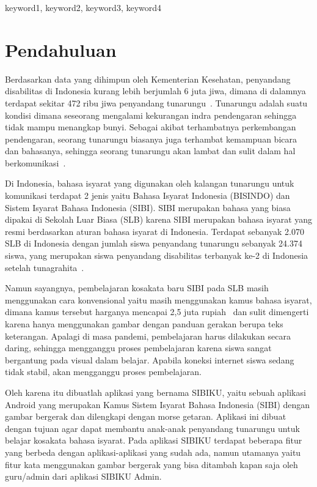 \documentclass[conference,a4paper,10pt]{IEEEtran}
\begin{document}
\begin{IEEEkeywords}
    keyword1, keyword2, keyword3, keyword4
\end{IEEEkeywords}

\section{Pendahuluan}
Berdasarkan data yang dihimpun oleh Kementerian Kesehatan, penyandang
disabilitas di Indonesia kurang lebih berjumlah 6 juta jiwa, dimana di dalamnya
terdapat sekitar 472 ribu jiwa penyandang tunarungu~\cite{ref1}. Tunarungu adalah
suatu kondisi dimana seseorang mengalami kekurangan indra pendengaran sehingga
tidak mampu menangkap bunyi. Sebagai akibat terhambatnya perkembangan pendengaran,
seorang tunarungu biasanya juga terhambat kemampuan bicara dan bahasanya,
sehingga seorang tunarungu akan lambat dan sulit dalam hal berkomunikasi~\cite{ref2}.

Di Indonesia, bahasa isyarat yang digunakan oleh kalangan tunarungu untuk
komunikasi terdapat 2 jenis yaitu Bahasa Isyarat Indonesia (BISINDO) dan Sistem
Isyarat Bahasa Indonesia (SIBI). SIBI merupakan bahasa yang biasa dipakai di
Sekolah Luar Biasa (SLB) karena SIBI merupakan bahasa isyarat yang resmi
berdasarkan aturan bahasa isyarat di Indonesia. Terdapat sebanyak 2.070 SLB di
Indonesia dengan jumlah siswa penyandang tunarungu sebanyak 24.374 siswa, yang
merupakan siswa penyandang disabilitas terbanyak ke-2 di Indonesia setelah
tunagrahita~\cite{ref3}.

Namun sayangnya, pembelajaran kosakata baru SIBI pada SLB masih menggunakan
cara konvensional yaitu masih menggunakan kamus bahasa isyarat, dimana kamus
tersebut harganya mencapai 2,5 juta rupiah~\cite{ref4} dan sulit dimengerti
karena hanya menggunakan gambar dengan panduan gerakan berupa teks keterangan.
Apalagi di masa pandemi, pembelajaran harus dilakukan secara daring, sehingga
mengganggu proses pembelajaran karena siswa sangat bergantung pada visual dalam
belajar. Apabila koneksi internet siswa sedang tidak stabil, akan mengganggu
proses pembelajaran.

Oleh karena itu dibuatlah aplikasi yang bernama SIBIKU, yaitu sebuah aplikasi
Android yang merupakan Kamus Sistem Isyarat Bahasa Indonesia (SIBI) dengan
gambar bergerak dan dilengkapi dengan morse getaran. Aplikasi ini dibuat dengan
tujuan agar dapat membantu anak-anak penyandang tunarungu untuk belajar
kosakata bahasa isyarat. Pada aplikasi SIBIKU terdapat beberapa fitur yang
berbeda dengan aplikasi-aplikasi yang sudah ada, namun utamanya yaitu fitur kata
menggunakan gambar bergerak yang bisa ditambah kapan saja oleh guru/admin dari
aplikasi SIBIKU Admin.
\end{document}

